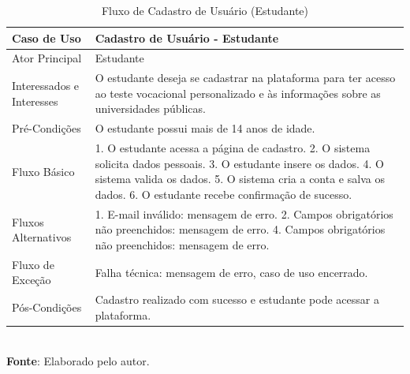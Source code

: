 \begin{table}[h!]
\centering
\caption{Fluxo de Cadastro de Usuário (Estudante)}
\begin{tabular}{|m{4cm}|m{11cm}|}
\hline
\textbf{Caso de Uso}   & \textbf{Cadastro de Usuário - Estudante} \\
\hline
Ator Principal & Estudante\\
\hline
Interessados e Interesses & O estudante deseja se cadastrar na plataforma para ter acesso ao teste vocacional personalizado e às informações sobre as universidades públicas. \\
\hline
Pré-Condições & O estudante possui mais de 14 anos de idade. \\
\hline
Fluxo Básico & 

1. O estudante acessa a página de cadastro.
2. O sistema solicita dados pessoais.
3. O estudante insere os dados.
4. O sistema valida os dados.
5. O sistema cria a conta e salva os dados.
6. O estudante recebe confirmação de sucesso.
\\
\hline
Fluxos Alternativos & 

1. E-mail inválido: mensagem de erro.
2. Campos obrigatórios não preenchidos: mensagem de erro.
4. Campos obrigatórios não preenchidos: mensagem de erro.
\\
\hline
Fluxo de Exceção & Falha técnica: mensagem de erro, caso de uso encerrado. \\
\hline
Pós-Condições & Cadastro realizado com sucesso e estudante pode acessar a plataforma. \\
\hline
\end{tabular}
\label{table:casos-de-uso}
\\[1ex]
\footnotesize \textbf{Fonte}: Elaborado pelo autor.
\end{table}

